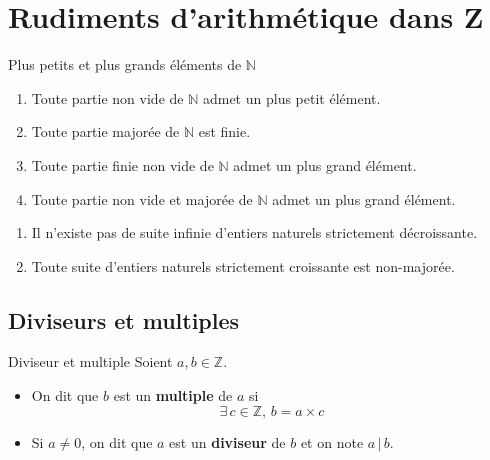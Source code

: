 
\section{Rudiments d’arithmétique dans Z}

    \begin{theo}{Plus petits et plus grands éléments de $\mathbb{N}$}{}
        \begin{enumerate}[label=(\roman*)]
            \item Toute partie non vide de $\mathbb{N}$ admet un plus petit élément.
            \item Toute partie majorée de $\mathbb{N}$ est finie.
            \item Toute partie finie non vide de $\mathbb{N}$ admet un plus grand élément.
            \item Toute partie non vide et majorée de $\mathbb{N}$ admet un plus grand élément.
    \end{enumerate}
    \end{theo}

    \begin{coro}{}{}
        \begin{enumerate}[label=(\roman*)]
        
        \item Il n’existe pas de suite infinie d’entiers naturels strictement décroissante.
        \item Toute suite d’entiers naturels strictement croissante est non-majorée.
        
        \end{enumerate}
    \end{coro}

\subsection{Diviseurs et multiples}

    \begin{defi}{Diviseur et multiple}{}
	Soient $a,b \in \mathbb{Z}$.
	    \begin{itemize}
		    \item On dit que $b$ est un \textbf{multiple} de $a$ si \[ \exists \, c \in \mathbb{Z}, \, b = a \times c \]
		    \item Si $a \neq 0$, on dit que $a$ est un \textbf{diviseur} de $b$ et on note $a \, | \, b$.
	    \end{itemize}
    \end{defi}

